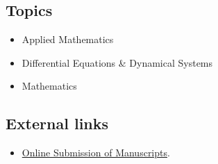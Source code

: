 \documentclass{book}
\numberwithin{equation}{section}
\begin{document}
\subsection{Topics}
\begin{itemize}
    \item Applied Mathematics
    \item Differential Equations \& Dynamical Systems
    \item Mathematics
\end{itemize}

\subsection{External links}
\begin{itemize}
    \item \href{https://mc.manuscriptcentral.com/dgans}{Online Submission of Manuscripts}.
\end{itemize}
\end{document}
